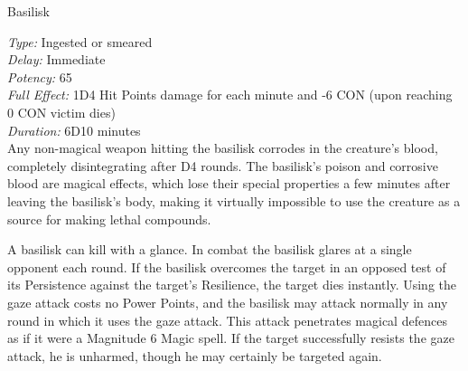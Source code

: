 \begin{monsterbox}{Basilisk}
\begin{rpg-monsteraction}
		\textit{Type:} Ingested or smeared\\
		\textit{Delay:} Immediate\\
		\textit{Potency:} 65\\
		\textit{Full Effect:} 1D4 Hit Points damage for each minute and -6 CON (upon reaching 0 CON victim dies)\\ 
		\textit{Duration:} 6D10 minutes\\
		Any non-magical weapon hitting the basilisk corrodes in the creature’s blood, completely disintegrating after D4 rounds. The basilisk’s poison and corrosive blood are magical effects, which lose their special properties a few minutes after leaving the basilisk’s body, making it virtually impossible to use the creature as a source for making lethal compounds.
	\end{rpg-monsteraction}
	\begin{rpg-monsteraction}
		A basilisk can kill with a glance. In combat the basilisk glares at a single opponent each round. If the basilisk overcomes the target in an opposed test of its Persistence against the target’s Resilience, the target dies instantly. Using the gaze attack costs no Power Points, and the basilisk may attack normally in any round in which it uses the gaze attack. This attack penetrates magical defences as if it were a Magnitude 6 Magic spell. If the target successfully resists the gaze attack, he is unharmed, though he may certainly be targeted again. 
	\end{rpg-monsteraction}

\end{monsterbox}

\newpage

